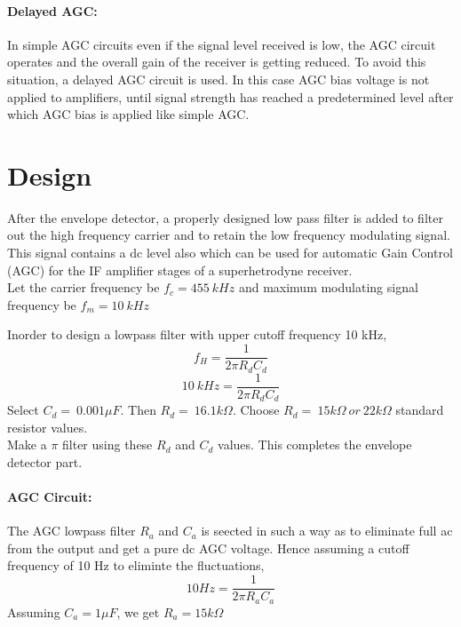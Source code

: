 \paragraph{Delayed AGC:}In simple AGC circuits even if the signal level received is low, the AGC circuit operates and the overall gain of the receiver is getting reduced. To avoid this situation, a delayed AGC circuit is used. In this case AGC bias voltage is not applied to amplifiers, until signal strength has reached a predetermined level after which AGC bias is applied like simple AGC.

\section*{Design}

 After the envelope detector, a properly designed low pass filter is added to filter out the high frequency carrier and to retain the low frequency modulating signal. This signal contains a dc level also which can be used for automatic Gain Control (AGC) for the IF amplifier stages of a superhetrodyne receiver.\\

\noindent Let the carrier frequency be $f_c=455\ kHz$ and maximum modulating signal frequency be $f_m=10\ kHz$

\noindent Inorder to design a lowpass filter with upper cutoff frequency 10 kHz,
\begin{equation}
f_H=\frac{1}{2\pi R_dC_d}
\end{equation}
\begin{equation}
10\ kHz=\frac{1}{2\pi R_dC_d}
\end{equation}
\noindent Select $C_d=\ 0.001 \mu F$. Then $R_d=\ 16.1k\Omega$.
Choose $R_d=\ 15k\Omega \ or\ 22k\Omega$ standard resistor values.\\

\noindent Make a $\pi$ filter using these $R_d$ and $C_d$ values. This completes the envelope detector part.
\paragraph{AGC Circuit:} The AGC lowpass filter $R_a$ and $C_a$ is seected in such a way as to eliminate full ac from the output and get a pure dc AGC voltage. 
Hence assuming a cutoff frequency of 10 Hz to eliminte the fluctuations,
\begin{equation}
10 Hz= \frac{1}{2\pi R_aC_a}
\end{equation}
\noindent Assuming $C_a=1 \mu F$, we get $R_a=15 k \Omega$
